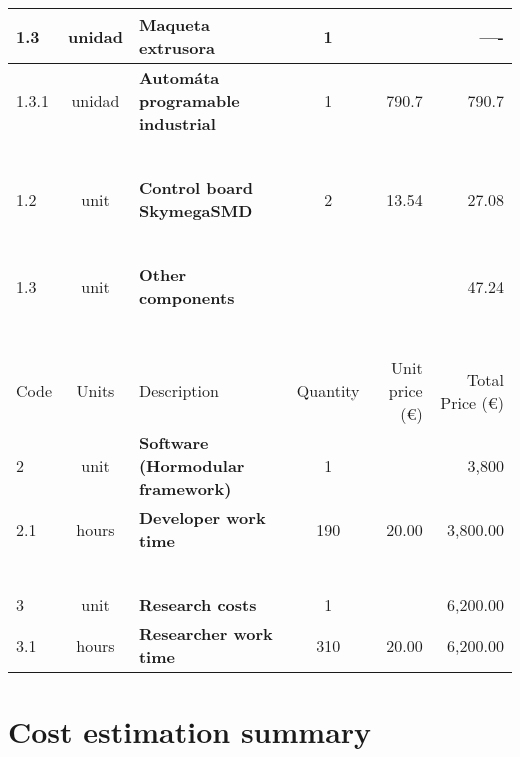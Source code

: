 \begin{longtable}{l c p{7cm} c r r}
    1.3 & unidad & \textbf{Maqueta extrusora} & 1 & \multicolumn{1}{r}{} & ---- \\ \hline 
    1.3.1 & unidad & \textbf{Automáta programable industrial} & 1 & 790.7 & 790.7 \\ \hline



    
     \\~\\  \hline
    1.2 & unit & \textbf{Control board SkymegaSMD} & 2 & 13.54 & 27.08 \\ \hline  
    
    \\~\\ \hline
    
    1.3 & unit & \textbf{Other components} &  & \multicolumn{1}{r}{} & 47.24 \\ \hline  

    \\ 

    \\~\\  \hline

Code & Units & Description  & Quantity & Unit price (\euro) & Total Price (\euro)  \\ \hline \hline \hline
    2 & unit & \textbf{Software (Hormodular framework)} & 1 & \multicolumn{1}{r}{} & 3,800 \\ \hline
    2.1 & hours & \textbf{Developer work time} & 190 & 20.00 & 3,800.00 \\ \hline  
    
    \\~\\ \hline
    3 & unit & \textbf{Research costs} & 1 & \multicolumn{1}{r}{} & 6,200.00 \\ \hline
    3.1 & hours & \textbf{Researcher work time} & 310 & 20.00 & 6,200.00 \\ \hline  
   
\end{longtable}

\newpage
\section{Cost estimation summary}

